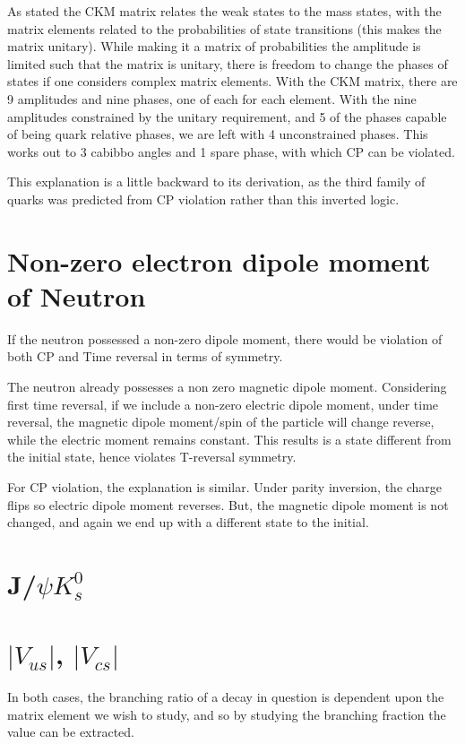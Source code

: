 \documentclass[]{article}
\begin{document}
	As stated the CKM matrix relates the weak states to the mass states, with the matrix elements related to the probabilities of state transitions (this makes the matrix unitary). While making it a matrix of probabilities the amplitude is limited such that the matrix is unitary, there is freedom to change the phases of states if one considers complex matrix elements. With the CKM matrix, there are 9 amplitudes and nine phases, one of each for each element. With the nine amplitudes constrained by the unitary requirement, and 5 of the phases capable of being quark relative phases, we are left with 4 unconstrained phases. This works out to 3 cabibbo angles and 1 spare phase, with which CP can be violated. 
	
	This explanation is a little backward to its derivation, as the third family of quarks was predicted from CP violation rather than this inverted logic.
	
\section{Non-zero electron dipole moment of Neutron}

	If the neutron possessed a non-zero dipole moment, there would be violation of both CP and Time reversal in terms of symmetry.
	
	The neutron already possesses a non zero magnetic dipole moment. Considering first time reversal, if we include a non-zero electric dipole moment, under time reversal, the magnetic dipole moment/spin of the particle will change reverse, while the electric moment remains constant. This results is a state different from the initial state, hence violates T-reversal symmetry. 
	
	For CP violation, the explanation is similar. Under parity inversion, the charge flips so electric dipole moment reverses. But, the magnetic dipole moment is not changed, and again we end up with a different state to the initial.
	
\section{J/$\psi K^0_s$}

\section{$|V_{us}|$, $|V_{cs}|$}

	In both cases, the branching ratio of a decay in question is dependent upon the matrix element we wish to study, and so by studying the branching fraction the value can be extracted.
\end{document}
